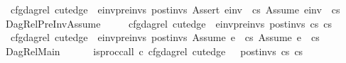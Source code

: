 \begin{isabellebody}
\ \ \ \ \ cfg{\isacharunderscore}{\kern0pt}dag{\isacharunderscore}{\kern0pt}rel\ cut{\isacharunderscore}{\kern0pt}edge\ {\isacharbrackleft}{\kern0pt}{\isacharbrackright}{\kern0pt}\ {\isacharparenleft}{\kern0pt}e{\isacharunderscore}{\kern0pt}inv{\isacharhash}{\kern0pt}pre{\isacharunderscore}{\kern0pt}invs{\isacharparenright}{\kern0pt}\ post{\isacharunderscore}{\kern0pt}invs\ {\isacharparenleft}{\kern0pt}Assert\ e{\isacharunderscore}{\kern0pt}inv\ {\isacharhash}{\kern0pt}\ cs{}{\isacharparenright}{\kern0pt}\ {\isacharparenleft}{\kern0pt}Assume\ e{\isacharunderscore}{\kern0pt}inv\ {\isacharhash}{\kern0pt}\ cs{}{\isacharparenright}{\kern0pt}{\isachardoublequoteclose}\isanewline
\ \ \ {\isacharbar}{\kern0pt}\ DagRel{\isacharunderscore}{\kern0pt}PreInv{\isacharunderscore}{\kern0pt}Assume{\isacharcolon}{\kern0pt}\isanewline
\ \ \ \ \ {\isachardoublequoteopen}{\isasymlbrakk}cfg{\isacharunderscore}{\kern0pt}dag{\isacharunderscore}{\kern0pt}rel\ cut{\isacharunderscore}{\kern0pt}edge\ {\isacharbrackleft}{\kern0pt}{\isacharbrackright}{\kern0pt}\ {\isacharparenleft}{\kern0pt}e{\isacharunderscore}{\kern0pt}inv{\isacharhash}{\kern0pt}pre{\isacharunderscore}{\kern0pt}invs{\isacharparenright}{\kern0pt}\ post{\isacharunderscore}{\kern0pt}invs\ cs{}\ cs{}{\isasymrbrakk}\ {\isasymLongrightarrow}\isanewline
\ \ \ \ \ cfg{\isacharunderscore}{\kern0pt}dag{\isacharunderscore}{\kern0pt}rel\ cut{\isacharunderscore}{\kern0pt}edge\ {\isacharbrackleft}{\kern0pt}{\isacharbrackright}{\kern0pt}\ {\isacharparenleft}{\kern0pt}e{\isacharunderscore}{\kern0pt}inv{\isacharhash}{\kern0pt}pre{\isacharunderscore}{\kern0pt}invs{\isacharparenright}{\kern0pt}\ post{\isacharunderscore}{\kern0pt}invs\ {\isacharparenleft}{\kern0pt}Assume\ e\ {\isacharhash}{\kern0pt}\ cs{}{\isacharparenright}{\kern0pt}\ {\isacharparenleft}{\kern0pt}Assume\ e\ {\isacharhash}{\kern0pt}\ cs{}{\isacharparenright}{\kern0pt}{\isachardoublequoteclose}\isanewline
\isanewline
\ \ \ {\isacharbar}{\kern0pt}\ DagRel{\isacharunderscore}{\kern0pt}Main{\isacharcolon}{\kern0pt}\isanewline
\ \ \ \ \ {\isachardoublequoteopen}{\isasymlbrakk}{\isasymnot}\ is{\isacharunderscore}{\kern0pt}proc{\isacharunderscore}{\kern0pt}call\ c{\isacharsemicolon}{\kern0pt}\ cfg{\isacharunderscore}{\kern0pt}dag{\isacharunderscore}{\kern0pt}rel\ cut{\isacharunderscore}{\kern0pt}edge\ {\isacharbrackleft}{\kern0pt}{\isacharbrackright}{\kern0pt}\ {\isacharbrackleft}{\kern0pt}{\isacharbrackright}{\kern0pt}\ post{\isacharunderscore}{\kern0pt}invs\ cs{}\ cs{}{\isasymrbrakk}\ {\isasymLongrightarrow}\isanewline

\end{isabellebody}
